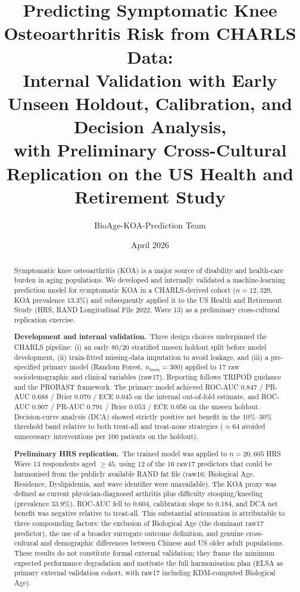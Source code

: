 \documentclass[11pt,a4paper]{article}
\title{Predicting Symptomatic Knee Osteoarthritis Risk from CHARLS Data:\\
\large Internal Validation with Early Unseen Holdout, Calibration, and Decision Analysis,\\
with Preliminary Cross-Cultural Replication on the US Health and Retirement Study}
\author{BioAge-KOA-Prediction Team}
\date{April 2026}
\begin{document}
\maketitle

\begin{abstract}
Symptomatic knee osteoarthritis (KOA) is a major source of disability and health-care burden in aging
populations. We developed and internally validated a machine-learning prediction model for symptomatic KOA
in a CHARLS-derived cohort ($n=12{,}329$, KOA prevalence $13.3\%$) and subsequently applied it to the US
Health and Retirement Study (HRS, RAND Longitudinal File 2022, Wave 13) as a preliminary cross-cultural
replication exercise.

\textbf{Development and internal validation.}\ Three design choices underpinned the CHARLS pipeline:
(i) an early 80/20 stratified unseen holdout split before model development,
(ii) train-fitted missing-data imputation to avoid leakage, and
(iii) a pre-specified primary model (Random Forest, $n_{\text{trees}}=300$) applied to 17 raw
sociodemographic and clinical variables (raw17). Reporting follows TRIPOD guidance and the PROBAST
framework. The primary model achieved ROC-AUC $0.847$ / PR-AUC $0.688$ / Brier $0.070$ / ECE $0.045$
on the internal out-of-fold estimate, and ROC-AUC $0.907$ / PR-AUC $0.791$ / Brier $0.053$ / ECE $0.056$
on the unseen holdout. Decision-curve analysis (DCA) showed strictly positive net benefit in the
10\%--30\% threshold band relative to both treat-all and treat-none strategies
(${\approx}64$ avoided unnecessary interventions per 100 patients on the holdout).

\textbf{Preliminary HRS replication.}\ The trained model was applied to $n=20{,}605$ HRS Wave 13
respondents aged $\geq 45$, using 12 of the 16 raw17 predictors that could be harmonised from the
publicly available RAND fat file (raw16; Biological Age, Residence, Dyslipidemia, and wave identifier
were unavailable). The KOA proxy was defined as current physician-diagnosed arthritis plus difficulty
stooping/kneeling (prevalence $33.9\%$). ROC-AUC fell to $0.604$, calibration slope to $0.184$, and DCA
net benefit was negative relative to treat-all. This substantial attenuation is attributable to three
compounding factors: the exclusion of Biological Age (the dominant raw17 predictor), the use of a
broader surrogate outcome definition, and genuine cross-cultural and demographic differences between
Chinese and US older adult populations. These results do not constitute formal external validation; they
frame the minimum expected performance degradation and motivate the full harmonisation plan
(ELSA as primary external validation cohort, with raw17 including KDM-computed Biological Age).
\end{abstract}
\end{document}
